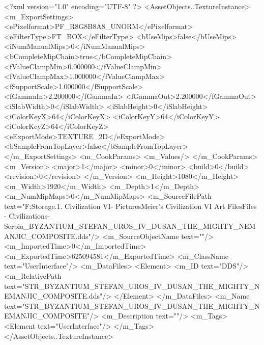 <?xml version="1.0" encoding="UTF-8" ?>
<AssetObjects..TextureInstance>
	<m_ExportSettings>
		<ePixelformat>PF_R8G8B8A8_UNORM</ePixelformat>
		<eFilterType>FT_BOX</eFilterType>
		<bUseMips>false</bUseMips>
		<iNumManualMips>0</iNumManualMips>
		<bCompleteMipChain>true</bCompleteMipChain>
		<fValueClampMin>0.000000</fValueClampMin>
		<fValueClampMax>1.000000</fValueClampMax>
		<fSupportScale>1.000000</fSupportScale>
		<fGammaIn>2.200000</fGammaIn>
		<fGammaOut>2.200000</fGammaOut>
		<iSlabWidth>0</iSlabWidth>
		<iSlabHeight>0</iSlabHeight>
		<iColorKeyX>64</iColorKeyX>
		<iColorKeyY>64</iColorKeyY>
		<iColorKeyZ>64</iColorKeyZ>
		<eExportMode>TEXTURE_2D</eExportMode>
		<bSampleFromTopLayer>false</bSampleFromTopLayer>
	</m_ExportSettings>
	<m_CookParams>
		<m_Values/>
	</m_CookParams>
	<m_Version>
		<major>1</major>
		<minor>0</minor>
		<build>0</build>
		<revision>0</revision>
	</m_Version>
	<m_Height>1080</m_Height>
	<m_Width>1920</m_Width>
	<m_Depth>1</m_Depth>
	<m_NumMipMaps>0</m_NumMipMaps>
	<m_SourceFilePath text="F:\Mod Storage\2.1. Civilization VI\Mods\Archive - Pictures\Sid Meier's Civilization VI Art Files\Art Files - Civilizations\Civilization - Serbia\STR_BYZANTIUM_STEFAN_UROS_IV_DUSAN_THE_MIGHTY_NEMANJIC_COMPOSITE.dds"/>
	<m_SourceObjectName text=""/>
	<m_ImportedTime>0</m_ImportedTime>
	<m_ExportedTime>625094581</m_ExportedTime>
	<m_ClassName text="UserInterface"/>
	<m_DataFiles>
		<Element>
			<m_ID text="DDS"/>
			<m_RelativePath text="STR_BYZANTIUM_STEFAN_UROS_IV_DUSAN_THE_MIGHTY_NEMANJIC_COMPOSITE.dds"/>
		</Element>
	</m_DataFiles>
	<m_Name text="STR_BYZANTIUM_STEFAN_UROS_IV_DUSAN_THE_MIGHTY_NEMANJIC_COMPOSITE"/>
	<m_Description text=""/>
	<m_Tags>
		<Element text="UserInterface"/>
	</m_Tags>
</AssetObjects..TextureInstance>

